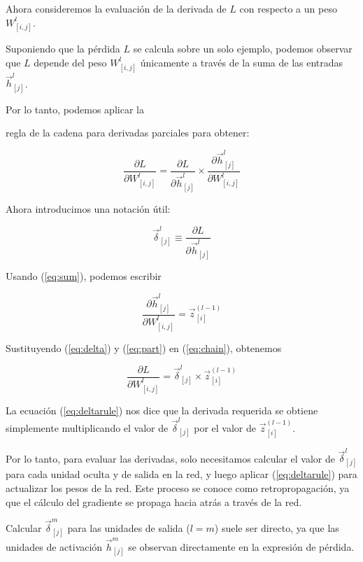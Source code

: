 Ahora consideremos la evaluación de la derivada de $L$ con respecto a un peso $W_{[i,j]}^l$.

Suponiendo que la pérdida $L$ se calcula sobre un solo ejemplo, podemos observar que $L$ depende del peso $W_{[i,j]}^l$ únicamente a través de la suma de las entradas $\vec{h}_{[j]}^{l}$.

Por lo tanto, podemos aplicar la

regla de la cadena para derivadas parciales para obtener:

\begin{equation}
\frac{\partial L}{\partial W_{[i,j]}^l} = \frac{\partial L}{\partial \vec{h}_{[j]}^{l}} \times \frac{\partial \vec{h}_{[j]}^{l}}{\partial W_{[i,j]}^l}
\label{eq:chain}
\end{equation}

Ahora introducimos una notación útil:

\begin{equation}
\vec{\delta}_{[j]}^l \equiv \frac{\partial L}{\partial \vec{h}_{[j]}^l}
\label{eq:delta}
\end{equation}

Usando (\ref{eq:sum}), podemos escribir

\begin{equation}
\frac{\partial \vec{h}_{[j]}^l}{\partial W_{[i,j]}^l} = \vec{z}_{[i]}^{(l-1)}
\label{eq:part}
\end{equation}

Sustituyendo (\ref{eq:delta}) y (\ref{eq:part}) en (\ref{eq:chain}), obtenemos

\begin{equation}
\frac{\partial L}{\partial W_{[i,j]}^l} = \vec{\delta}_{[j]}^l \times \vec{z}_{[i]}^{(l-1)}
\label{eq:deltarule}
\end{equation}

La ecuación (\ref{eq:deltarule}) nos dice que la derivada requerida se obtiene simplemente multiplicando el valor de $\vec{\delta}_{[j]}^l$ por el valor de $\vec{z}_{[i]}^{(l-1)}$.

Por lo tanto, para evaluar las derivadas, solo necesitamos calcular el valor de $\vec{\delta}_{[j]}^l$ para cada unidad oculta y de salida en la red, y luego aplicar (\ref{eq:deltarule}) para actualizar los pesos de la red. Este proceso se conoce como retropropagación, ya que el cálculo del gradiente se propaga hacia atrás a través de la red.


Calcular $\vec{\delta}_{[j]}^m$ para las unidades de salida ($l=m$) suele ser directo, ya que las unidades de activación $\vec{h}_{[j]}^m$ se observan directamente en la expresión de pérdida.

